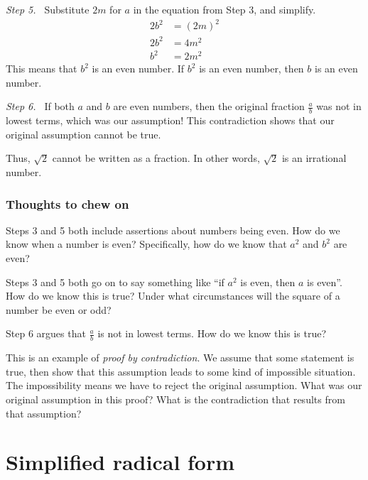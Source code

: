\textit{Step 5.~} Substitute $2m$ for $a$ in the equation from Step 3, and simplify.\[\begin{aligned} 2b^2 &= (2m)^2 \\ 2b^2 &= 4m^2 \\ b^2 &= 2m^2 \end{aligned}\] This means that $b^2$ is an even number. If $b^2$ is an even number, then $b$ is an even number.

\textit{Step 6.~} If both $a$ and $b$ are even numbers, then the original fraction $\frac{a}{b}$ was not in lowest terms, which was our assumption! This contradiction shows that our original assumption cannot be true.

Thus, $\sqrt{2}$ cannot be written as a fraction. In other words, $\sqrt2$ is an irrational number.

\subsubsection{Thoughts to chew on}

Steps 3 and 5 both include assertions about numbers being even. How do we know when a number is even? Specifically, how do we know that $a^2$ and $b^2$ are even?

Steps 3 and 5 both go on to say something like ``if $a^2$ is even, then $a$ is even''. How do we know this is true? Under what circumstances will the square of a number be even or odd?

Step 6 argues that $\frac{a}{b}$ is not in lowest terms. How do we know this is true?

This is an example of \textit{proof by contradiction}. We assume that some statement is true, then show that this assumption leads to some kind of impossible situation. The impossibility means we have to reject the original assumption. What was our original assumption in this proof? What is the contradiction that results from that assumption?

\section{Simplified radical form}
\label{sec:radsimplifiedform}



